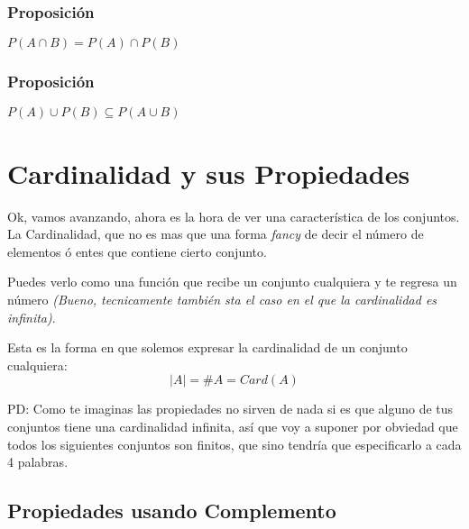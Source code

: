 \documentclass[12pt]{report}                                    %
\begin{document}
                \subsubsection{Proposición}
                    $P(A \cap B) = P(A) \cap P(B)$

                \subsubsection{Proposición}
                    $P(A) \cup P(B) \subseteq P(A \cup B)$






        \clearpage
        \section{Cardinalidad y sus Propiedades}
                
            Ok, vamos avanzando, ahora es la hora de ver una característica de los conjuntos.
            La Cardinalidad, que no es mas que una forma \emph{fancy} de decir el número de 
            elementos ó entes que contiene cierto conjunto.

            Puedes verlo como una función que recibe un conjunto cualquiera y te regresa
            un número \emph{(Bueno, tecnicamente también sta el caso en el que la cardinalidad es infinita)}.

            Esta es la forma en que solemos expresar la cardinalidad de un conjunto cualquiera:
            \begin{equation}   
                |A| = \#A = Card(A)
            \end{equation}

            PD: Como te imaginas las propiedades no sirven de nada si es que alguno de tus conjuntos
            tiene una cardinalidad infinita, así que voy a suponer por obviedad que todos los siguientes
            conjuntos son finitos, que sino tendría que especificarlo a cada 4 palabras.



            \clearpage
            \subsection{Propiedades usando Complemento}
                
\end{document}
